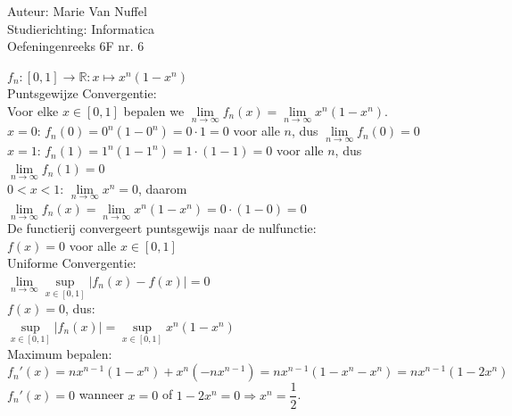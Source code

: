 \documentclass[a4paper]{article}
\begin{document}
  
\noindent \large Auteur: Marie Van Nuffel \\
\noindent \large Studierichting: Informatica\\
\noindent \large Oefeningenreeks 6F nr. 6\\

\medskip

\normalsize

$f_n : [0,1] \to \mathbb{R} : x \mapsto x^n(1-x^n)$\\

Puntsgewijze Convergentie:\\

Voor elke $x \in [0,1]$ bepalen we $\lim\limits_{n \to \infty} f_n(x) = \lim\limits_{n \to \infty} x^n(1-x^n)$.\\

$x = 0$: $f_n(0) = 0^n(1-0^n) = 0 \cdot 1 = 0$ voor alle $n$, dus $\lim\limits_{n \to \infty} f_n(0) = 0$\\

$x = 1$: $f_n(1) = 1^n(1-1^n) = 1 \cdot (1-1) = 0$ voor alle $n$, dus $\lim\limits_{n \to \infty} f_n(1) = 0$\\

$0 < x < 1$: $\lim\limits_{n \to \infty} x^n = 0$, daarom $\lim\limits_{n \to \infty} f_n(x) = \lim\limits_{n \to \infty} x^n(1-x^n) = 0 \cdot (1-0) = 0$\\

De functierij convergeert puntsgewijs naar de nulfunctie:\\

$f(x) = 0$ voor alle $x \in [0,1]$\\

Uniforme Convergentie:\\

$\lim\limits_{n \to \infty} \sup\limits_{x \in [0,1]} |f_n(x) - f(x)| = 0$\\

$f(x) = 0$, dus:\\

$\sup\limits_{x \in [0,1]} |f_n(x)| = \sup\limits_{x \in [0,1]} x^n(1-x^n)$\\

Maximum bepalen:\\

$f_n'(x) = nx^{n-1}(1-x^n) + x^n(-nx^{n-1}) = nx^{n-1}(1-x^n-x^n) = nx^{n-1}(1-2x^n)$\\

$f_n'(x) = 0$ wanneer $x = 0$ of $1-2x^n = 0 \Rightarrow x^n = \dfrac{1}{2}$.\\
\end{document}
